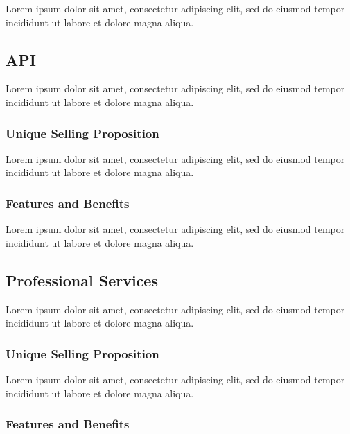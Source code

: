 Lorem ipsum dolor sit amet, consectetur adipiscing elit, sed do eiusmod tempor incididunt ut labore et dolore magna aliqua.


\subsection{API}

Lorem ipsum dolor sit amet, consectetur adipiscing elit, sed do eiusmod tempor incididunt ut labore et dolore magna aliqua.

\subsubsection*{Unique Selling Proposition}

Lorem ipsum dolor sit amet, consectetur adipiscing elit, sed do eiusmod tempor incididunt ut labore et dolore magna aliqua.

\subsubsection*{Features and Benefits}

Lorem ipsum dolor sit amet, consectetur adipiscing elit, sed do eiusmod tempor incididunt ut labore et dolore magna aliqua.


\subsection{Professional Services}

Lorem ipsum dolor sit amet, consectetur adipiscing elit, sed do eiusmod tempor incididunt ut labore et dolore magna aliqua.

\subsubsection*{Unique Selling Proposition}

Lorem ipsum dolor sit amet, consectetur adipiscing elit, sed do eiusmod tempor incididunt ut labore et dolore magna aliqua.

\subsubsection*{Features and Benefits}

